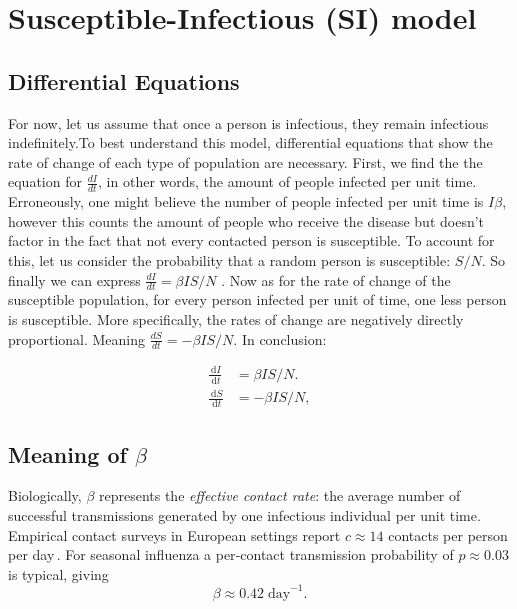 \documentclass[11pt]{article}
\newcommand{\dd}{\,\mathrm{d}}
\begin{document}
\section{Susceptible-Infectious (SI) model} \label{sec:SI}
\subsection*{Differential Equations }
For now, let us assume that once a person is infectious, they remain infectious indefinitely.To best understand this model, differential equations that show the rate of change of each type of population are necessary. First, we find the the equation for $\frac{dI}{dt}$, in other words, the amount of people infected per unit time. Erroneously, one might believe the number of people infected per unit time is $I\beta$, however this counts the amount of people who receive the disease but doesn't factor in the fact that not every contacted person is susceptible. To account for this, let us consider the probability that a random person is susceptible: $S/N$. So finally we can express $\frac{dI}{dt}=\beta I S/N$ . Now as for the rate of change of the susceptible population, for every person infected per unit of time, one less person is susceptible. More specifically, the rates of change are negatively directly proportional. Meaning $\frac{dS}{dt}=-\beta I S/N$. In conclusion:

\begin{subequations}\label{eq:SIeqs}
\begin{align}
  \frac{\dd I}{\dd t} &=  \beta I S/N. \label{eq:SIeqsI}\\ 
  \frac{\dd S}{\dd t} &= -\beta I S/N, \label{eq:SIeqsS}
\end{align}
\end{subequations}
\subsection*{Meaning of \(\beta\)}
Biologically, \(\beta\) represents the \emph{effective contact rate}: the average number of successful transmissions generated by one infectious individual per unit time. Empirical contact surveys in European settings report $c\approx14$ contacts per person per day\,\citep{Mossong2008}.  For seasonal influenza a per‑contact transmission probability of $p\approx0.03$ is typical, giving
\begin{equation*} 
  \beta\approx0.42\;\text{day}^{-1}.
\end{equation*} 
\end{document}
